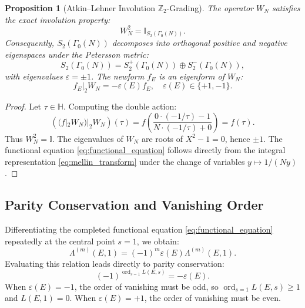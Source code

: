 \documentclass[11pt,reqno]{article}
\theoremstyle{plain}
\newtheorem{proposition}[theorem]{Proposition}
\theoremstyle{definition}
\DeclareMathOperator{\ord}{ord}
\begin{document}
\begin{proposition}[Atkin--Lehner Involution $\mathbb{Z}_2$-Grading]
\label{prop:atkin_lehner_grading}
The operator $W_N$ satisfies the exact involution property:
\begin{equation}
    W_N^2 = \mathbb{I}_{S_2(\Gamma_0(N))}.
\end{equation}
Consequently, $S_2(\Gamma_0(N))$ decomposes into orthogonal positive and negative eigenspaces under the Petersson metric:
\begin{equation}
    S_2(\Gamma_0(N)) = S_2^+(\Gamma_0(N)) \oplus S_2^-(\Gamma_0(N)),
\end{equation}
with eigenvalues $\varepsilon = \pm 1$. The newform $f_E$ is an eigenform of $W_N$:
\begin{equation}
    f_E |_2 W_N = -\varepsilon(E) f_E, \quad \varepsilon(E) \in \{+1, -1\}.
\end{equation}
\end{proposition}
\begin{proof}
Let $\tau \in \mathbb{H}$. Computing the double action:
\begin{equation}
    \left( (f |_2 W_N) |_2 W_N \right)(\tau) = f\left( \frac{0 \cdot (-1/\tau) - 1}{N \cdot (-1/\tau) + 0} \right) = f(\tau).
\end{equation}
Thus $W_N^2 = \mathbb{I}$. The eigenvalues of $W_N$ are roots of $X^2 - 1 = 0$, hence $\pm 1$. The functional equation \eqref{eq:functional_equation} follows directly from the integral representation \eqref{eq:mellin_transform} under the change of variables $y \mapsto 1/(N y)$.
\end{proof}

\subsection{Parity Conservation and Vanishing Order}

Differentiating the completed functional equation \eqref{eq:functional_equation} repeatedly at the central point $s = 1$, we obtain:
\begin{equation}
    \Lambda^{(m)}(E, 1) = (-1)^m \varepsilon(E) \Lambda^{(m)}(E, 1).
\end{equation}
Evaluating this relation leads directly to parity conservation:
\begin{equation}
    \label{eq:spectral_parity}
    \boxed{(-1)^{\ord_{s=1} L(E, s)} = -\varepsilon(E).}
\end{equation}
When $\varepsilon(E) = -1$, the order of vanishing must be odd, so $\ord_{s=1} L(E, s) \ge 1$ and $L(E, 1) = 0$. When $\varepsilon(E) = +1$, the order of vanishing must be even.
\end{document}
